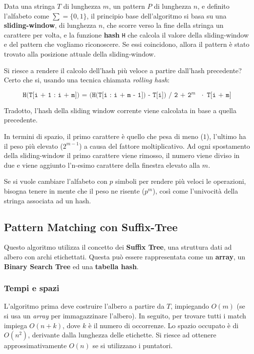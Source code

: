 \documentclass{article}
\begin{document}
Data una stringa $T$ di lunghezza $m$, un pattern $P$ di lunghezza $n$, e definito l'alfabeto come $\sum = \{0,1\}$, il principio base dell'algoritmo si basa su una \textbf{sliding-window}, di lunghezza $n$, che scorre verso la fine della stringa un carattere per volta, e la funzione \textbf{hash} \texttt{H} che calcola il valore della sliding-window e del pattern che vogliamo riconoscere. Se essi coincidono, allora il pattern è stato trovato alla posizione attuale della sliding-window.

Si riesce a rendere il calcolo dell'hash più veloce a partire dall'hash precedente? Certo che si, usando una tecnica chiamata \textit{rolling hash}:

\begin{equation*}
    \texttt{H(T[i + 1 : i + m]) = (H(T[i : i + m - 1]) - T[i]) / 2 + 2$^m$ $\cdot$ T[i + m]}
\end{equation*}

Tradotto, l'hash della sliding window corrente viene calcolata in base a quella precedente.

In termini di spazio, il primo carattere è quello che pesa di meno ($1$), l'ultimo ha il peso più elevato ($2^{m-1}$) a causa del fattore moltiplicativo. Ad ogni spostamento della sliding-window il primo carattere viene rimosso, il numero viene diviso in due e viene aggiunto l'n-esimo carattere della finestra elevato alla $m$.

Se si vuole cambiare l'alfabeto con $p$ simboli per rendere più veloci le operazioni, bisogna tenere in mente che il peso ne risente ($p^m$), così come l'univocità della stringa associata ad un hash.

\subsection{Pattern Matching con Suffix-Tree}

Questo algoritmo utilizza il concetto dei \textbf{Suffix Tree}, una struttura dati ad albero con archi etichettati. Questa può essere rappresentata come un \textbf{array}, un \textbf{Binary Search Tree} ed una \textbf{tabella hash}.

\subsubsection{Tempi e spazi}

L'algoritmo prima deve costruire l'albero a partire da $T$, impiegando $O(m)$ (se si usa un \textit{array} per immagazzinare l'albero). In seguito, per trovare tutti i match impiega $O(n + k)$, dove $k$ è il numero di occorrenze. Lo spazio occupato è di $O(n^2)$, derivante dalla lunghezza delle etichette. Si riesce ad ottenere approssimativamente $O(n)$ se si utilizzano i puntatori.
\end{document}
